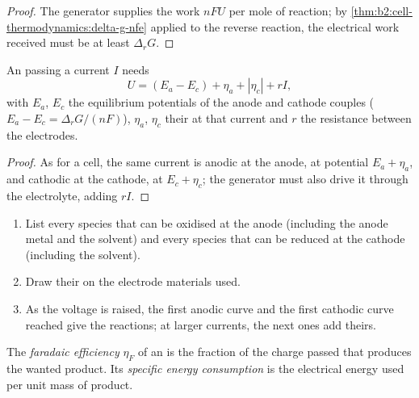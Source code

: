 \begin{proof}
The generator supplies the work $nFU$ per mole of reaction; by
\cref{thm:b2:cell-thermodynamics:delta-g-nfe} applied to the reverse reaction, the
electrical work received must be at least $\Delta_r G$.
\end{proof}

\begin{proposition}\label{prop:b2:batteries-electrolysis:electrolysis-voltage}
An  passing a current $I$ needs
\[
  U = (E_a - E_c) + \eta_a + |\eta_c| + rI ,
\]
with $E_a$, $E_c$ the equilibrium potentials of the anode and cathode couples
($E_a - E_c = \Delta_r G/(nF)$), $\eta_a$, $\eta_c$ their  at that
current and $r$ the resistance between the electrodes.
\end{proposition}

\begin{proof}
As for a cell, the same current is anodic at the anode, at potential $E_a +
\eta_a$, and cathodic at the cathode, at $E_c + \eta_c$; the generator must also
drive it through the electrolyte, adding $rI$.
\end{proof}

\begin{method}\label{met:b2:batteries-electrolysis:predict-electrolysis}
\begin{enumerate}
  \item List every species that can be oxidised at the anode (including the
        anode metal and the solvent) and every species that can be reduced at
        the cathode (including the solvent).
  \item Draw their  on the electrode materials used.
  \item As the voltage is raised, the first anodic curve and the first cathodic
        curve reached give the reactions; at larger currents, the next ones add
        theirs.
\end{enumerate}
\end{method}

\begin{definition}\label{def:b2:batteries-electrolysis:faradaic-efficiency}
The \emph{faradaic efficiency} $\eta_F$ of an
 is the fraction of the charge passed that produces the wanted
product. Its \emph{specific energy consumption}
is the electrical energy used per unit mass of product.
\end{definition}

